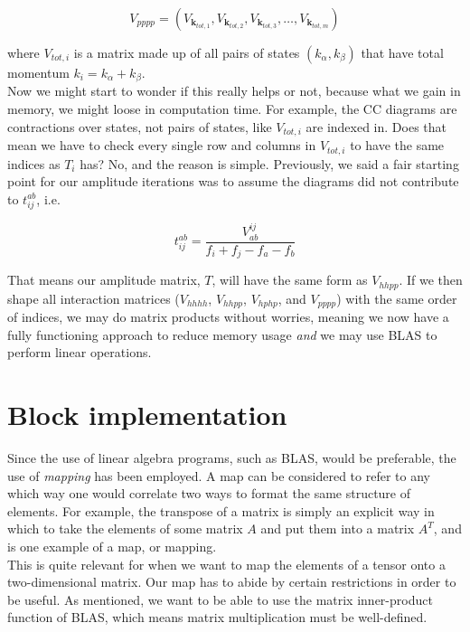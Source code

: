 \documentclass[10pt]{report}
\begin{document}
	\begin{equation}
		V_{pppp} = \left( V_{\bm{k}_{tot,1}}, V_{\bm{k}_{tot,2}}, V_{\bm{k}_{tot,3}}, \ldots, V_{\bm{k}_{tot,m}}\right)
	\end{equation}
	
	where $V_{tot,i}$ is a matrix made up of all pairs of states $(k_\alpha, k_\beta)$ that have total momentum $k_i = k_\alpha + k_\beta$.\\
	
	Now we might start to wonder if this really helps or not, because what we gain in memory, we might loose in computation time. For example, the CC diagrams are contractions over states, not pairs of states, like $V_{tot,i}$ are indexed in. Does that mean we have to check every single row and columns in $V_{tot,i}$ to have the same indices as $T_{i}$ has? No, and the reason is simple. Previously, we said a fair starting point for our amplitude iterations was to assume the diagrams did not contribute to $t_{ij}^{ab}$, i.e.
	
	\begin{equation}
		t_{ij}^{ab} = \frac{V_{ab}^{ij}}{f_i + f_j - f_a - f_b}
	\end{equation}
	
	That means our amplitude matrix, $T$, will have the same form as $V_{hhpp}$. If we then shape all interaction matrices ($V_{hhhh}$, $V_{hhpp}$, $V_{hphp}$, and $V_{pppp}$) with the same order of indices, we may do matrix products without worries, meaning we now have a fully functioning approach to reduce memory usage \emph{and} we may use BLAS to perform linear operations.
	
	\section{Block implementation}
	Since the use of linear algebra programs, such as BLAS, would be preferable, the use of \emph{mapping} has been employed. A map can be considered to refer to any which way one would correlate two ways to format the same structure of elements. For example, the transpose of a matrix is simply an explicit way in which to take the elements of some matrix $A$ and put them into a matrix $A^T$, and is one example of a map, or mapping.\\
	This is quite relevant for when we want to map the elements of a tensor onto a two-dimensional matrix. Our map has to abide by certain restrictions in order to be useful. As mentioned, we want to be able to use the matrix inner-product function of BLAS, which means matrix multiplication must be well-defined.\\
	
\end{document}
